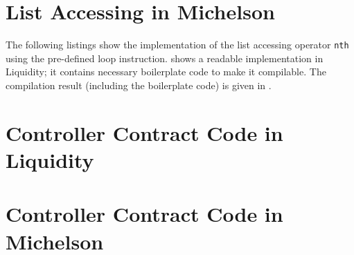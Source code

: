 \chapter{List Accessing in Michelson}\label{apx:nth}

The following listings show the implementation of the list accessing operator \texttt{nth} using the pre-defined loop instruction.  shows a readable implementation in Liquidity; it contains necessary boilerplate code to make it compilable. The compilation result (including the boilerplate code) is given in .


				 


\chapter{Controller Contract Code in \\ \mbox{Liquidity}}\label{apx:controller_liq}


\chapter{Controller Contract Code in Michelson}\label{apx:controller_michelson}

				 
